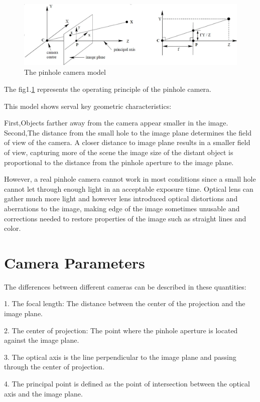 \documentclass{article}
\begin{document}
\begin{figure}[h!]
    \includegraphics[width=\linewidth]{fig1.1.png}
    \caption{The pinhole camera model}\label{fig:1.1}
\end{figure}

The fig1.\ref{fig:1.1} represents the operating principle of the pinhole camera.

This model shows serval key geometric characteristics:

First,Objects farther away from the camera appear smaller in the image. Second,The distance from the small hole to the image plane determines the field of view of the camera. A closer distance to image plane results in a smaller field of view, capturing more of the scene the image size of the distant object is proportional to the distance from the pinhole aperture to the image plane.

However, a real pinhole camera cannot work in most conditions since a small hole cannot let through enough light in an acceptable exposure time. Optical lens can gather much more light and however lens introduced optical distortions and aberrations to the image, making edge of the image sometimes unusable and corrections needed to restore properties of the image such as straight lines and color.

\section{Camera Parameters}
The differences between different cameras can be described in these quantities:  

1. The focal length: The distance between the center of the projection and the image plane.

2. The center of projection: The point where the pinhole aperture is located against the image plane.

3. The optical axis is the line perpendicular to the image plane and passing through the center of projection.

4. The principal point is defined as the point of intersection between the optical axis and the image plane.
\end{document}
